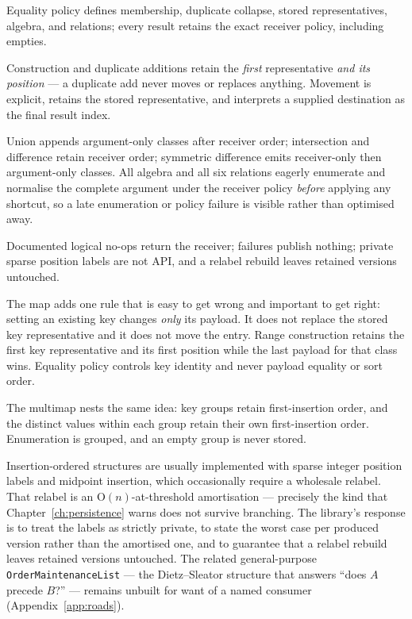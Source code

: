 \documentclass[11pt,twoside,openright]{book}
\newcommand{\code}[1]{\texorpdfstring{\textcolor{d7ink}{\texttt{#1}}}{#1}}
\newcommand{\bigoh}[1]{$\mathrm{O}(#1)$}
\begin{document}
\begin{contractbox}
Equality policy defines membership, duplicate collapse, stored representatives,
algebra, and relations; every result retains the exact receiver policy,
including empties.

Construction and duplicate additions retain the \emph{first} representative
\emph{and its position} --- a duplicate add never moves or replaces anything.
Movement is explicit, retains the stored representative, and interprets a
supplied destination as the final result index.

Union appends argument-only classes after receiver order; intersection and
difference retain receiver order; symmetric difference emits receiver-only then
argument-only classes. All algebra and all six relations eagerly enumerate and
normalise the complete argument under the receiver policy \emph{before} applying
any shortcut, so a late enumeration or policy failure is visible rather than
optimised away.

Documented logical no-ops return the receiver; failures publish nothing; private
sparse position labels are not API, and a relabel rebuild leaves retained
versions untouched.
\end{contractbox}

The map adds one rule that is easy to get wrong and important to get right:
setting an existing key changes \emph{only} its payload. It does not replace the
stored key representative and it does not move the entry. Range construction
retains the first key representative and its first position while the last
payload for that class wins. Equality policy controls key identity and never
payload equality or sort order.

The multimap nests the same idea: key groups retain first-insertion order, and
the distinct values within each group retain their own first-insertion order.
Enumeration is grouped, and an empty group is never stored.

\begin{asidebox}
Insertion-ordered structures are usually implemented with sparse integer
position labels and midpoint insertion, which occasionally require a wholesale
relabel. That relabel is an \bigoh{n}-at-threshold amortisation --- precisely
the kind that Chapter~\ref{ch:persistence} warns does not survive branching.
The library's response is to treat the labels as strictly private, to state the
worst case per produced version rather than the amortised one, and to guarantee
that a relabel rebuild leaves retained versions untouched. The related
general-purpose \code{OrderMaintenanceList} --- the Dietz--Sleator structure that
answers ``does $A$ precede $B$?'' --- remains unbuilt for want of a named
consumer (Appendix~\ref{app:roads}).
\end{asidebox}
\end{document}
